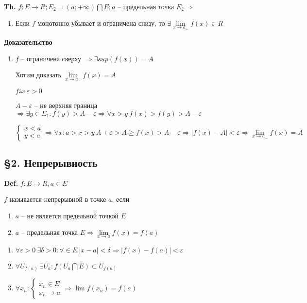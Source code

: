 \documentclass[14pt, letter paper]{article}
\begin{document}
\textbf{Th.} $f : E \rightarrow R; E_2 = (a; + \infty) \bigcap E; a$ -- предельная точка $E_2 \Rightarrow$

\begin{enumerate}
    \item Если $f$ монотонно убывает и ограничена снизу, то $\exists \lim\limits_{x \rightarrow a_+}{f(x)} \in R$
\end{enumerate}

\begin{center}
    \textbf{Доказательство}
\end{center}

\begin{enumerate}
    \item $f$ -- ограничена сверху $\Rightarrow \exists sup(f(x)) = A$

    Хотим доказать $\lim\limits_{x \rightarrow a_-}{f(x)} = A$

    $fix\ \varepsilon > 0$

    $A - \varepsilon$ -- не верхняя граница $\Rightarrow \exists y \in E_1 : f(y) > A - \varepsilon \Rightarrow \forall x > y\ f(x) > f(y) > A - \varepsilon$

    $\begin{cases}
        x < a \\
        y < a
    \end{cases} \Rightarrow \forall x : a > x > y\ A + \varepsilon > A \geq f(x) > A - \varepsilon \Rightarrow |f(x) - A| < \varepsilon \Rightarrow \lim\limits_{x \rightarrow a_-}{f(x)} = A$
\end{enumerate}

\begin{center}
    \subsection*{\S 2. Непрерывность}
\end{center}

\textbf{Def.} $f : E \rightarrow R, a \in E$

$f$ называется непрерывной в точке $a$, если 

\begin{enumerate}
    \item $a$ -- не является предельной точкой $E$
    \item $a$ -- предельная точка $E \Rightarrow \lim\limits_{x \rightarrow a}{f(x)} = f(a)$
\end{enumerate}

\begin{enumerate}
    \item $\forall \varepsilon > 0\ \exists \delta > 0 : \forall \in E\ |x-a| < \delta \Rightarrow |f(x) - f(a)| < \varepsilon$

    \item $\forall U_{f(a)}\ \exists U_a : f(U_a \bigcap E) \subset U_{f(a)}$

    \item $\forall x_n : \begin{cases}
        x_n \in E \\
        x_n \rightarrow a
    \end{cases} \Rightarrow \lim{f(x_n)} = f(a)$
\end{enumerate}
\end{document}
